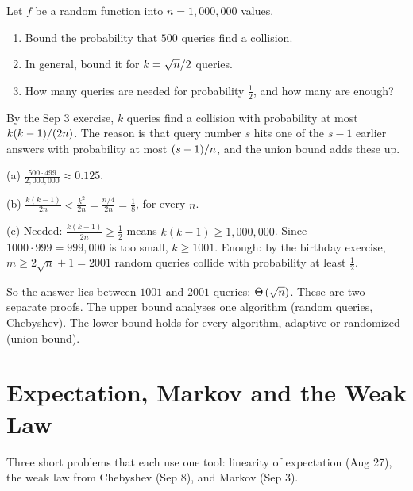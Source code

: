 \begin{exercisebox}
\begin{pproblem}\label{pp:collision-num}
    Let $f$ be a random function into $n = 1{,}000{,}000$ values.
    \begin{enumerate}[label=(\alph*)]
        \item Bound the probability that $500$ queries find a collision.
        \item In general, bound it for $k = \sqrt{n}/2$ queries.
        \item How many queries are needed for probability $\frac{1}{2}$, and how many are enough?
    \end{enumerate}
\end{pproblem}
\tcblower
\begin{wsolution}
    By the Sep 3 exercise, $k$ queries find a collision with probability at most
    $k(k-1)/(2n)$. The reason is that query number $s$ hits one of the $s - 1$ earlier
    answers with probability at most $(s-1)/n$, and the union bound adds these up.

    (a) $\frac{500 \cdot 499}{2{,}000{,}000} \approx 0.125$.

    (b) $\frac{k(k-1)}{2n} < \frac{k^2}{2n} = \frac{n/4}{2n} = \frac{1}{8}$, for every $n$.

    (c) Needed: $\frac{k(k-1)}{2n} \geq \frac{1}{2}$ means $k(k-1) \geq 1{,}000{,}000$. Since
    $1000 \cdot 999 = 999{,}000$ is too small, $k \geq 1001$. Enough: by the birthday exercise,
    $m \geq 2\sqrt{n} + 1 = 2001$ random queries collide with probability at least $\frac{1}{2}$.

    So the answer lies between $1001$ and $2001$ queries: $\Theta\left(\sqrt{n}\right)$. These are two
    separate proofs. The upper bound analyses one algorithm (random queries, Chebyshev). The lower
    bound holds for every algorithm, adaptive or randomized (union bound).
\end{wsolution}
\end{exercisebox}

\section{Expectation, Markov and the Weak Law}\label{sec:expect}

Three short problems that each use one tool: linearity of expectation (Aug 27), the weak law from
Chebyshev (Sep 8), and Markov (Sep 3).

